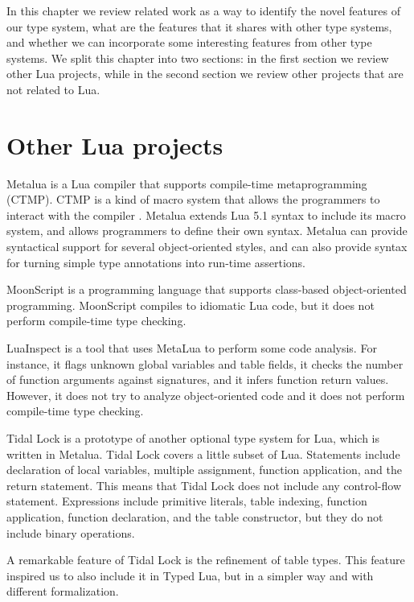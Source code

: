 In this chapter we review related work as a way to identify the novel
features of our type system, what are the features that it shares with
other type systems, and whether we can incorporate some interesting
features from other type systems.
We split this chapter into two sections: in the first section we review
other Lua projects, while in the second section we review other
projects that are not related to Lua.

\section{Other Lua projects}

Metalua \citep{metalua} is a Lua compiler that supports compile-time
metaprogramming (CTMP).
CTMP is a kind of macro system that allows the programmers to interact
with the compiler \citep{fleutot2007contrasting}.
Metalua extends Lua 5.1 syntax to include its macro system,
and allows programmers to define their own syntax.
Metalua can provide syntactical support for several object-oriented
styles, and can also provide syntax for turning simple type
annotations into run-time assertions.

MoonScript \citep{moonscript} is a programming language that supports
class-based object-oriented programming.
MoonScript compiles to idiomatic Lua code, but
it does not perform compile-time type checking.

LuaInspect \citep{luainspect} is a tool that uses MetaLua to perform
some code analysis.
For instance, it flags unknown global variables and table fields,
it checks the number of function arguments against signatures, and
it infers function return values.
However, it does not try to analyze object-oriented code and
it does not perform compile-time type checking.

Tidal Lock \citep{tidallock} is a prototype of another optional type
system for Lua, which is written in Metalua.
Tidal Lock covers a little subset of Lua.
Statements include declaration of local variables, multiple assignment,
function application, and the return statement.
This means that Tidal Lock does not include any control-flow statement.
Expressions include primitive literals, table indexing, function application,
function declaration, and the table constructor, but they do not include
binary operations.

A remarkable feature of Tidal Lock is the refinement of table types.
This feature inspired us to also include it in Typed Lua,
but in a simpler way and with different formalization.

